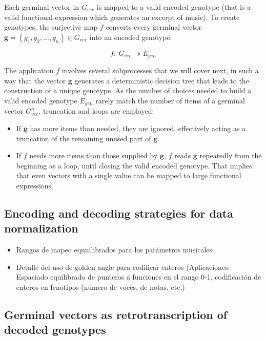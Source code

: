 \documentclass{article}
\renewcommand{\vec}[1]{\mathbf{#1}}
\begin{document}
Each germinal vector in $G_{vec}$ is mapped to a valid encoded genotype (that is a valid functional expression which generates an excerpt of music). To create genotypes, the surjective map $f$ converts every germinal vector $\vec{g} = (g_1, g_2, ..., g_n) \in G_{vec}$ into an encoded genotype: 

$$f:\ G_{vec}\twoheadrightarrow E_{gen}$$

The application $f$ involves several subprocesses that we will cover next, in such a way that the vector $\vec{g}$ generates a deterministic decision tree that leads to the construction of a unique genotype. As the number of choices needed to build a valid encoded genotype $E_{gen}$ rarely match the number of items of a germinal vector $G_{vec}^n$, truncation and loops are employed:

\begin{itemize}
\item If $\vec{g}$ has more items than needed, they are ignored, effectively acting as a truncation of the remaining unused part of $\vec{g}$.

\item If $f$ needs more items than those supplied by $\vec{g}$, $f$ reads $\vec{g}$ repeatedly from the beginning as a loop, until closing the valid encoded genotype. That implies that even vectors with a single value can be mapped to large functional expressions. 

\end{itemize}









\subsection{Encoding and decoding strategies for data normalization}

{\color{gray}
\begin{itemize}
\item Rangos de mapeo equuilibrados para los parámetros musicales
\item Detalle del uso de golden angle para codificar enteros (Aplicaciones: Espaciado equilibrado de punteros a funciones en el rango 0-1, codificación de enteros en fenotipos (número de voces, de notas, etc.)
\end{itemize}
}


\subsection{Germinal vectors as retrotranscription of decoded genotypes}
\end{document}
